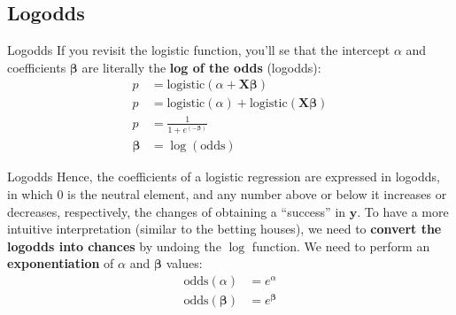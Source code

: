 \subsection*{Logodds}
\begin{frame}[noframenumbering]{Logodds}
    If you revisit the logistic function, you'll se that the intercept $\alpha$
    and coefficients $\boldsymbol{\beta}$ are literally the \textbf{log of the odds}
    (logodds):
    $$
        \begin{aligned}
            p                  & = \text{logistic}(\alpha +  \mathbf{X} \boldsymbol{\beta} )                 \\
            p                  & = \text{logistic}(\alpha) + \text{logistic}( \mathbf{X} \boldsymbol{\beta}) \\
            p                  & = \frac{1}{1 + e^{(-\boldsymbol{\beta})}}                                   \\
            \boldsymbol{\beta} & = \log(\text{odds})
        \end{aligned}
    $$
\end{frame}

\begin{frame}[noframenumbering]{Logodds}
    Hence, the coefficients of a logistic regression are expressed in logodds,
    in which $0$ is the neutral element,
    and any number above or below it increases or decreases, respectively,
    the changes of obtaining a ``success'' in $\mathbf{y}$.
    To have a more intuitive interpretation (similar to the betting houses),
    we need to \textbf{convert the logodds into chances} by undoing the $\log$ function.
    We need to perform an \textbf{exponentiation} of $\alpha$ and $\boldsymbol{\beta}$
    values:
    $$
        \begin{aligned}
            \text{odds}(\alpha)               & = e^\alpha               \\
            \text{odds}({\boldsymbol{\beta}}) & = e^{\boldsymbol{\beta}}
        \end{aligned}
    $$
\end{frame}
